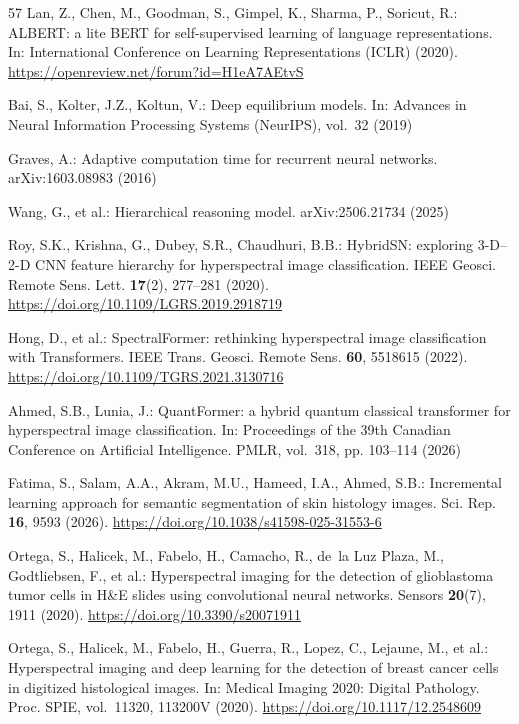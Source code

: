\documentclass{svproc}
\begin{document}
\begin{thebibliography}{57}
Lan, Z., Chen, M., Goodman, S., Gimpel, K., Sharma, P., Soricut, R.: ALBERT: a lite BERT for self-supervised learning of language representations. In: International Conference on Learning Representations (ICLR) (2020). \url{https://openreview.net/forum?id=H1eA7AEtvS}

Bai, S., Kolter, J.Z., Koltun, V.: Deep equilibrium models. In: Advances in Neural Information Processing Systems (NeurIPS), vol.~32 (2019)

Graves, A.: Adaptive computation time for recurrent neural networks. arXiv:1603.08983 (2016)

Wang, G., et al.: Hierarchical reasoning model. arXiv:2506.21734 (2025)

Roy, S.K., Krishna, G., Dubey, S.R., Chaudhuri, B.B.: HybridSN: exploring 3-D--2-D CNN feature hierarchy for hyperspectral image classification. IEEE Geosci. Remote Sens. Lett. \textbf{17}(2), 277--281 (2020). \url{https://doi.org/10.1109/LGRS.2019.2918719}

Hong, D., et al.: SpectralFormer: rethinking hyperspectral image classification with Transformers. IEEE Trans. Geosci. Remote Sens. \textbf{60}, 5518615 (2022). \url{https://doi.org/10.1109/TGRS.2021.3130716}

Ahmed, S.B., Lunia, J.: QuantFormer: a hybrid quantum classical transformer for hyperspectral image classification. In: Proceedings of the 39th Canadian Conference on Artificial Intelligence. PMLR, vol.~318, pp. 103--114 (2026)

Fatima, S., Salam, A.A., Akram, M.U., Hameed, I.A., Ahmed, S.B.: Incremental learning approach for semantic segmentation of skin histology images. Sci. Rep. \textbf{16}, 9593 (2026). \url{https://doi.org/10.1038/s41598-025-31553-6}

Ortega, S., Halicek, M., Fabelo, H., Camacho, R., de~la Luz Plaza, M., Godtliebsen, F., et al.: Hyperspectral imaging for the detection of glioblastoma tumor cells in H\&E slides using convolutional neural networks. Sensors \textbf{20}(7), 1911 (2020). \url{https://doi.org/10.3390/s20071911}

Ortega, S., Halicek, M., Fabelo, H., Guerra, R., Lopez, C., Lejaune, M., et al.: Hyperspectral imaging and deep learning for the detection of breast cancer cells in digitized histological images. In: Medical Imaging 2020: Digital Pathology. Proc. SPIE, vol.~11320, 113200V (2020). \url{https://doi.org/10.1117/12.2548609}


\end{thebibliography}
\end{document}
